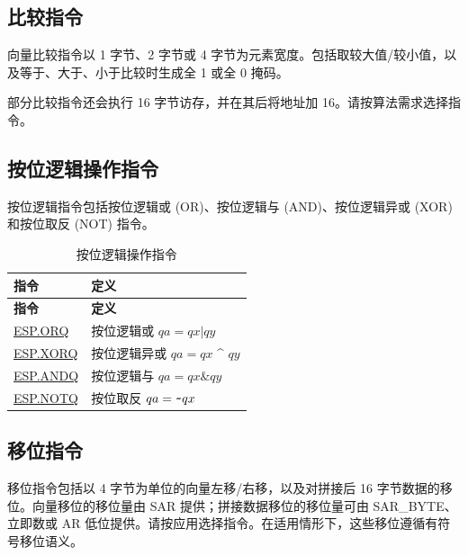 \documentclass[main\_\_CN.tex]{subfiles}
\begin{document}
\subsection{比较指令}
\label{sec:pie-comparison-instructions}

向量比较指令以 1 字节、2 字节或 4 字节为元素宽度。包括取较大值/较小值，以及等于、大于、小于比较时生成全 1 或全 0 掩码。

部分比较指令还会执行 16 字节访存，并在其后将地址加 16。请按算法需求选择指令。




\subsection{按位逻辑操作指令}
\label{sec:pie-bitwise-logic-instructions}

按位逻辑指令包括按位逻辑或 (OR)、按位逻辑与 (AND)、按位逻辑异或 (XOR) 和按位取反 (NOT) 指令。

\begin{longtable}[c]{|l|m{10cm}|}
    \caption{按位逻辑操作指令}
    \label{tab:pie-bitwise-logic-instructions}\\
    \hline
    \rowcolor{lightgray}
    \textbf{指令} & \textbf{定义} \\\hline
    \endfirsthead
    \rowcolor{lightgray}
    \textbf{指令} & \textbf{定义} \\\hline
    \endhead
    \endfoot

    \hyperref[instruction:ESPORQ]{ESP.ORQ} & 按位逻辑或 $qa = qx | qy$
    \\\hline
    \hyperref[instruction:ESPXORQ]{ESP.XORQ} & 按位逻辑异或 $qa = qx$ \^{} $qy$
    \\\hline
    \hyperref[instruction:ESPANDQ]{ESP.ANDQ} & 按位逻辑与 $qa = qx \& qy$
    \\\hline
    \hyperref[instruction:ESPNOTQ]{ESP.NOTQ} & 按位取反 $qa =\verb+~+ qx$
    \\\hline
\end{longtable}

\subsection{移位指令}
\label{sec:pie-shift-instructions}

移位指令包括以 4 字节为单位的向量左移/右移，以及对拼接后 16 字节数据的移位。向量移位的移位量由 SAR 提供；拼接数据移位的移位量可由 SAR\_BYTE、立即数或 AR 低位提供。请按应用选择指令。在适用情形下，这些移位遵循有符号移位语义。
\end{document}
